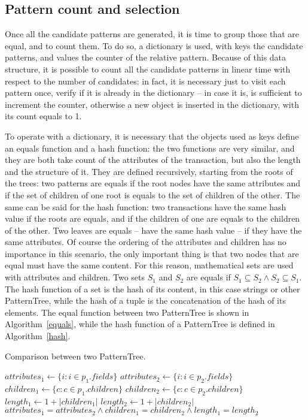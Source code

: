 \documentclass{acm_proc_article-sp-sigmod09}
\begin{document}
\subsection{Pattern count and selection}
Once all the candidate patterns are generated, it is time to group those that are equal, and to count them. To do so, a dictionary is used, with keys the candidate patterns, and values the counter of the relative pattern. Because of this data structure, it is possible to count all the candidate patterns in linear time with respect to the number of candidates: in fact, it is necessary just to visit each pattern once, verify if it is already in the dictionary -- in case it is, is sufficient to increment the counter, otherwise a new object is inserted in the dictionary, with its count equals to 1.

To operate with a dictionary, it is necessary that the objects used as keys define an equals function and a hash function: the two functions are very similar, and they are both take count of the attributes of the transaction, but also the length and the structure of it. They are defined recursively, starting from the roots of the trees: two patterns are equals if the root nodes have the same attributes and if the set of children of one root is equals to the set of children of the other. The same can be said for the hash function: two transactions have the same hash value if the roots are equals, and if the children of one are equals to the children of the other. Two leaves are equals -- have the same hash value -- if they have the same attributes. Of course the ordering of the attributes and children has no importance in this scenario, the only important thing is that two nodes that are equal must have the same content. For this reason, mathematical sets are used with attributes and children. Two sets $S_1$ and $S_2$ are equals if $S_1 \subseteq S_2 \land S_2 \subseteq S_1$. The hash function of a set is the hash of its content, in this case strings or other PatternTree, while the hash of a tuple is the concatenation of the hash of its elements. The equal function between two PatternTree is shown in Algorithm~\ref{equals}, while the hash function of a PatternTree is defined in Algorithm~\ref{hash}.

\begin{algorithm}
\caption{Comparison between two PatternTree.}
\label{equals}
\begin{algorithmic}[1]
\State $attributes_1 \gets \{i : i \in p_1.fields\}$
\State $attributes_2 \gets \{i : i \in p_2.fields\}$
\State $children_1 \gets \{c : c \in p_1.children\}$
\State $children_2 \gets \{c : c \in p_2.children\}$
\State $length_1 \gets 1 + |children_1|$
\State $length_2 \gets 1 + |children_2|$ \\
\Return $attributes_1 = attributes_2 \land children_1 = children_2 \land length_1 = length_2$
\EndFunction
\end{algorithmic}
\end{algorithm}
\end{document}
